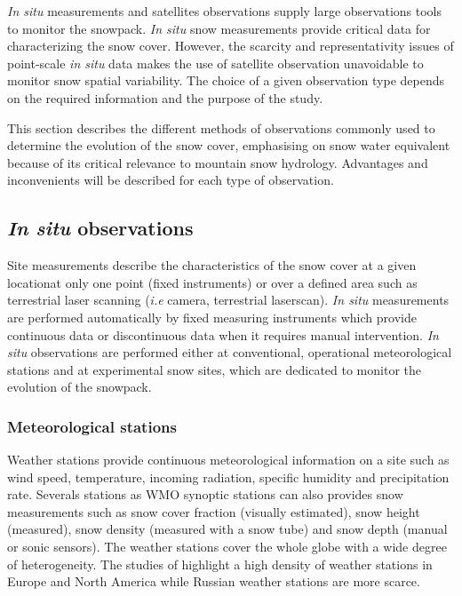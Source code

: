 \documentclass[hydrology,article,submit,moreauthors,pdftex]{Definitions/mdpi}
\begin{document}
\textit{In situ} measurements and satellites observations supply large observations tools to monitor the snowpack. \textit{In situ} snow measurements provide critical data for characterizing the snow cover. However, the scarcity and representativity issues of point-scale \textit{in situ} data makes the use of satellite observation unavoidable to monitor snow spatial variability. The choice of a given observation type depends on the required information and the purpose of the study.

This section describes the different methods of observations commonly used to determine the evolution of the snow cover, emphasising on snow water equivalent because of its critical relevance to mountain snow hydrology. Advantages and inconvenients will be described for each type of observation. 

\subsection{\textit{In situ} observations}

Site measurements describe the characteristics of the snow cover at a given locationat only one point (fixed instruments) or over a defined area such as terrestrial laser scanning (\textit{i.e} camera, terrestrial laserscan). \textit{In situ} measurements are performed automatically by fixed measuring instruments which provide continuous data or discontinuous data when it requires manual intervention. \textit{In situ} observations are performed either at conventional, operational meteorological stations and at experimental snow sites, which are dedicated to monitor the evolution of the snowpack.%

\subsubsection{Meteorological stations}
Weather stations provide continuous meteorological information on a site such as wind speed, temperature, incoming radiation, specific humidity and precipitation rate. Severals stations as WMO synoptic stations can also provides snow measurements such as snow cover fraction (visually estimated), snow height (measured), snow density (measured with a snow tube) and snow depth (manual or sonic sensors).  The weather stations cover the whole globe with a wide degree of heterogeneity. The studies of \citet{Ripper_2015snowpex} highlight a high density of weather stations in Europe and North America while Russian weather stations are more scarce.  
\end{document}
